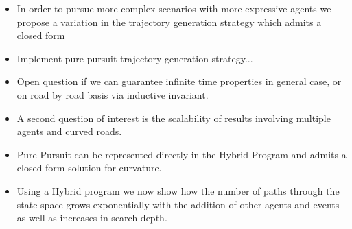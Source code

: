 \documentclass{easychair}
\theoremstyle{theorem}
\theoremstyle{remark}
\begin{document}
\begin{itemize}
	\item In order to pursue more complex scenarios with more expressive agents we propose a variation in the trajectory generation strategy which admits a closed form
	\item Implement pure pursuit trajectory generation strategy...
\end{itemize}
\begin{itemize}

	\item Open question if we can guarantee infinite time properties in general case, or on road by road basis via inductive invariant. 
	\item A second question of interest is the scalability of results involving multiple agents and curved roads. 
	\item Pure Pursuit can be represented directly in the Hybrid Program and admits a closed form solution for curvature.
	\item Using a Hybrid program we now show how the number of paths through the state space grows exponentially with the addition of other agents and events as well as increases in search depth. 
\end{itemize}
\end{document}
